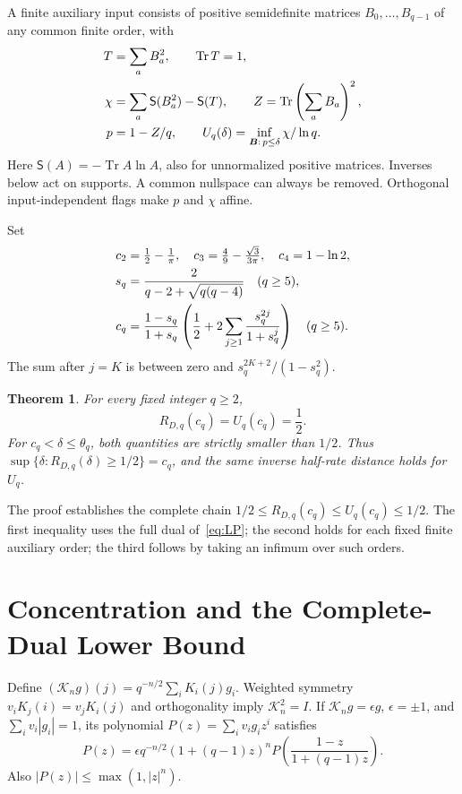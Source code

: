 \documentclass[12pt,letterpaper,onecolumn]{article}
\newtheorem{theorem}{Theorem}
\DeclareMathOperator{\Tr}{Tr}
\newcommand{\K}{\mathcal K}
\newcommand{\Ent}{\mathsf S}
\begin{document}
A finite auxiliary input consists of positive semidefinite matrices $B_0,\ldots,B_{q-1}$ of any common finite order, with
\begin{align}
T&=\sum_aB_a^2,\qquad \Tr T=1,\notag\\
\chi&=\sum_a\Ent(B_a^2)-\Ent(T),\qquad
Z=\Tr\left(\sum_aB_a\right)^2,\label{eq:input}\\
p&=1-Z/q,\qquad
U_q(\delta)=\inf_{\boldsymbol B:\,p\le\delta}\chi/\ln q.\notag
\end{align}
Here $\Ent(A)=-\Tr A\ln A$, also for unnormalized positive matrices. Inverses below act on supports. A common nullspace can always be removed. Orthogonal input-independent flags make $p$ and $\chi$ affine.

Set
\begin{align}
c_2&=\tfrac12-\tfrac1\pi,\quad
c_3=\tfrac49-\tfrac{\sqrt3}{3\pi},\quad c_4=1-\ln2,\label{eq:csmall}\\
s_q&=\frac2{q-2+\sqrt{q(q-4)}}\quad(q\ge5),\notag\\
c_q&=\frac{1-s_q}{1+s_q}
\left(\frac12+2\sum_{j\ge1}\frac{s_q^{2j}}{1+s_q^j}\right)
\quad(q\ge5).\label{eq:cseries}
\end{align}
The sum after $j=K$ is between zero and $s_q^{2K+2}/(1-s_q^2)$.

\begin{theorem}\label{thm:main}
For every fixed integer $q\ge2$,
\begin{equation}\label{eq:main}
R_{D,q}(c_q)=U_q(c_q)=\frac12.
\end{equation}
For $c_q<\delta\le\theta_q$, both quantities are strictly smaller than $1/2$. Thus $\sup\{\delta:R_{D,q}(\delta)\ge1/2\}=c_q$, and the same inverse half-rate distance holds for $U_q$.
\end{theorem}

The proof establishes the complete chain
$1/2\le R_{D,q}(c_q)\le U_q(c_q)\le1/2$.
The first inequality uses the full dual of~\eqref{eq:LP}; the second holds for each fixed finite auxiliary order; the third follows by taking an infimum over such orders.

\section{Concentration and the Complete-Dual Lower Bound}
Define $(\K_ng)(j)=q^{-n/2}\sum_iK_i(j)g_i$. Weighted symmetry $v_iK_j(i)=v_jK_i(j)$ and orthogonality imply $\K_n^2=I$. If $\K_ng=\epsilon g$, $\epsilon=\pm1$, and $\sum_iv_i|g_i|=1$, its polynomial $P(z)=\sum_iv_ig_iz^i$ satisfies
\begin{equation}\label{eq:functional}
P(z)=\epsilon q^{-n/2}(1+(q-1)z)^n
P\left(\frac{1-z}{1+(q-1)z}\right).
\end{equation}
Also $|P(z)|\le\max(1,|z|^n)$.
\end{document}

